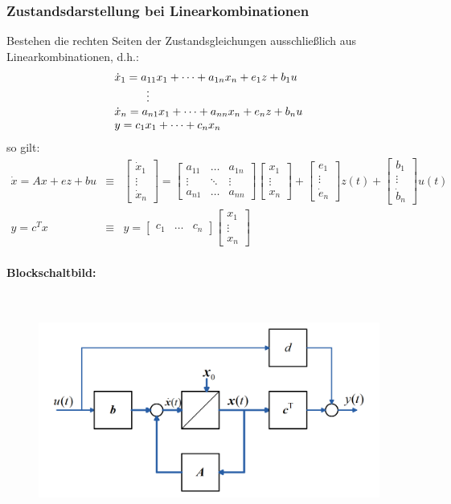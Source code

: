\documentclass[10pt,a4paper]{article}
\newcommand{\tab}[1][1]{\hspace*{#1cm}}
\newcommand{\vect}[1]{\ensuremath{\begin{bmatrix}#1\end{bmatrix}}}
\begin{document}
\subsubsection{Zustandsdarstellung bei Linearkombinationen}
Bestehen die rechten Seiten der Zustandsgleichungen ausschließlich aus Linearkombinationen, d.h.:
$$
\begin{array}{l}
	\dot x_1 = a_{11} x_1 + \dots + a_{1n} x_n + e_1 z + b_1 u \\
	\tab \vdots \\
	\dot x_n = a_{n1} x_1 + \dots + a_{nn} x_n + e_n z + b_n u \\
	y = c_1 x_1 + \dots + c_n x_n
\end{array}	
$$
so gilt:
$$
\begin{array}{lcl}
	\dot{x} = A x + e z + b u & ≡ & \vect{\dot x_1 \\ \vdots \\ \dot x_n} = \vect{a_{11} & \dots & a_{1n} \\ \vdots & \ddots & \vdots \\ a_{n1} & \dots & a_{nn}} \vect{x_1 \\ \vdots \\ x_n} + \vect{e_1 \\ \vdots \\ \dot e_n} z(t) + \vect{b_1 \\ \vdots \\ \dot b_n} u(t) \\
	y = c^Tx & ≡ & y = \vect{c_1 & \dots & c_n} \vect{x_1 \\ \vdots \\ x_n}
\end{array}
$$

\paragraph*{Blockschaltbild:} ~\\
\begin{figure}[H]
	\includegraphics[width=0.8\columnwidth]{imgs/abb2_12.png}
\end{figure}
\end{document}
